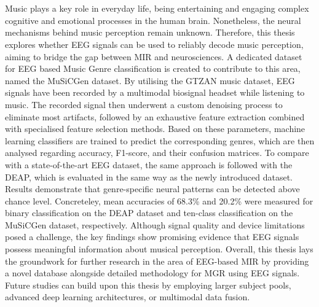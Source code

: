 \chapter{\abstractname}

Music plays a key role in everyday life, being entertaining and engaging complex cognitive and emotional processes in the human brain. Nonetheless, the neural mechanisms behind music perception remain unknown. Therefore, this thesis explores whether \ac{EEG} signals can be used to reliably decode music perception, aiming to bridge the gap between \ac{MIR} and neurosciences. A dedicated dataset for \ac{EEG} based Music Genre classification is created to contribute to this area, named the \ac{MuSiCGen} dataset. By utilising the GTZAN music dataset, \ac{EEG} signals have been recorded by a multimodal biosignal headset while listening to music. The recorded signal then underwent a custom denoising process to eliminate most artifacts, followed by an exhaustive feature extraction combined with specialised feature selection methods. Based on these parameters, machine learning classifiers are trained to predict the corresponding genres, which are then analysed regarding accuracy, F1-score, and their confusion matrices. To compare with a state-of-the-art \ac{EEG} dataset, the same approach is followed with the \ac{DEAP}, which is evaluated in the same way as the newly introduced dataset. Results demonstrate that genre-specific neural patterns can be detected above chance level. Concreteley, mean accuracies of 68.3\% and 20.2\% were measured for binary classification on the \ac{DEAP} dataset and ten-class classification on the \ac{MuSiCGen} dataset, respectively. Although signal quality and device limitations posed a challenge, the key findings show promising evidence that \ac{EEG} signals possess meaningful information about musical perception. Overall, this thesis lays the groundwork for further research in the area of \ac{EEG}-based \ac{MIR} by providing a novel database alongside detailed methodology for \ac{MGR} using \ac{EEG} signals. Future studies can build upon this thesis by employing larger subject pools, advanced deep learning architectures, or multimodal data fusion.
